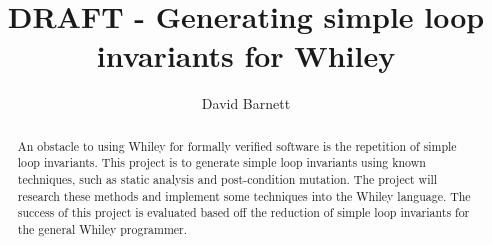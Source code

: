 \documentclass[11pt, a4paper, twoside, openright]{report}
\title{DRAFT - Generating simple loop invariants for Whiley}
\author{David Barnett}
\date{}
\begin{document}
\frontmatter


\begin{abstract}
    An obstacle to using Whiley for formally verified software is the 
    repetition of simple loop invariants.
    This project is to generate simple loop invariants using
    known techniques, such as static analysis and post-condition mutation.
    The project will research these methods and implement some techniques
    into the Whiley language.
    The success of this project is evaluated based off the reduction
    of simple loop invariants for the general Whiley programmer.
\end{abstract}


\maketitle




\mainmatter


%
\end{document}
